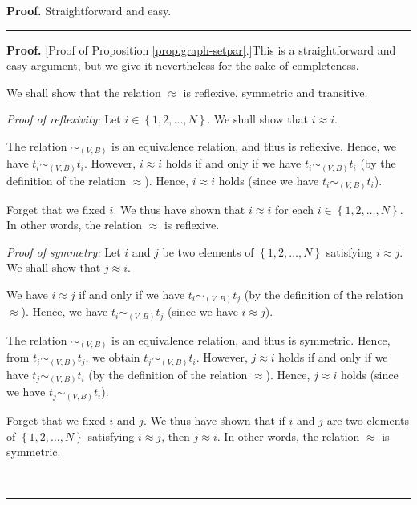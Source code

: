 \documentclass[numbers=enddot,12pt,final,onecolumn,notitlepage]{scrartcl}%
\theoremstyle{definition}
\newenvironment{proof}[1][Proof]{\noindent\textbf{#1.} }{\ \rule{0.5em}{0.5em}}
\newenvironment{verlong}{}{}
\newenvironment{vershort}{}{}
\begin{document}
\begin{vershort}
\begin{proof}
Straightforward and easy.
\end{proof}
\end{vershort}

\begin{verlong}
\begin{proof}
[Proof of Proposition \ref{prop.graph-setpar}.]This is a straightforward and
easy argument, but we give it nevertheless for the sake of completeness.

We shall show that the relation $\approx$ is reflexive, symmetric and transitive.

\textit{Proof of reflexivity:} Let $i\in\left\{  1,2,\ldots,N\right\}  $. We
shall show that $i\approx i$.

The relation $\sim_{\left(  V,B\right)  }$ is an equivalence relation, and
thus is reflexive. Hence, we have $t_{i}\sim_{\left(  V,B\right)  }t_{i}$.
However, $i\approx i$ holds if and only if we have $t_{i}\sim_{\left(
V,B\right)  }t_{i}$ (by the definition of the relation $\approx$). Hence,
$i\approx i$ holds (since we have $t_{i}\sim_{\left(  V,B\right)  }t_{i}$).

Forget that we fixed $i$. We thus have shown that $i\approx i$ for each
$i\in\left\{  1,2,\ldots,N\right\}  $. In other words, the relation $\approx$
is reflexive.

\textit{Proof of symmetry:} Let $i$ and $j$ be two elements of $\left\{
1,2,\ldots,N\right\}  $ satisfying $i\approx j$. We shall show that $j\approx
i$.

We have $i\approx j$ if and only if we have $t_{i}\sim_{\left(  V,B\right)
}t_{j}$ (by the definition of the relation $\approx$). Hence, we have
$t_{i}\sim_{\left(  V,B\right)  }t_{j}$ (since we have $i\approx j$).

The relation $\sim_{\left(  V,B\right)  }$ is an equivalence relation, and
thus is symmetric. Hence, from $t_{i}\sim_{\left(  V,B\right)  }t_{j}$, we
obtain $t_{j}\sim_{\left(  V,B\right)  }t_{i}$. However, $j\approx i$ holds if
and only if we have $t_{j}\sim_{\left(  V,B\right)  }t_{i}$ (by the definition
of the relation $\approx$). Hence, $j\approx i$ holds (since we have
$t_{j}\sim_{\left(  V,B\right)  }t_{i}$).

Forget that we fixed $i$ and $j$. We thus have shown that if $i$ and $j$ are
two elements of $\left\{  1,2,\ldots,N\right\}  $ satisfying $i\approx j$,
then $j\approx i$. In other words, the relation $\approx$ is symmetric.


\end{proof}
\end{verlong}
\end{document}
